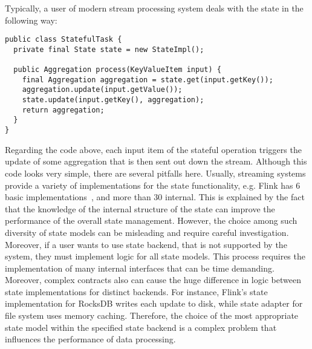 
Typically, a user of modern stream processing system deals with the state in the following way:

\begin{lstlisting}
public class StatefulTask {
  private final State state = new StateImpl();

  public Aggregation process(KeyValueItem input) {
    final Aggregation aggregation = state.get(input.getKey());
    aggregation.update(input.getValue());
    state.update(input.getKey(), aggregation);
    return aggregation;
  }
}
\end{lstlisting}

Regarding the code above, each input item of the stateful operation triggers the update of some aggregation that is then sent out down the stream. Although this code looks very simple, there are several pitfalls here. Usually, streaming systems provide a variety of implementations for the state functionality, e.g. Flink has 6 basic implementations~\cite{apache:flink:state}, and more than 30 internal. This is explained by the fact that the knowledge of the internal structure of the state can improve the performance of the overall state management. However, the choice among such diversity of state models can be misleading and require careful investigation. Moreover, if a user wants to use state backend, that is not supported by the system, they must implement logic for all state models. This process requires the implementation of many internal interfaces that can be time demanding. Moreover, complex contracts also can cause the huge difference in logic between state implementations for distinct backends. For instance, Flink's state implementation for RocksDB writes each update to disk, while state adapter for file system uses memory caching. Therefore, the choice of the most appropriate state model within the specified state backend is a complex problem that influences the performance of data processing.


